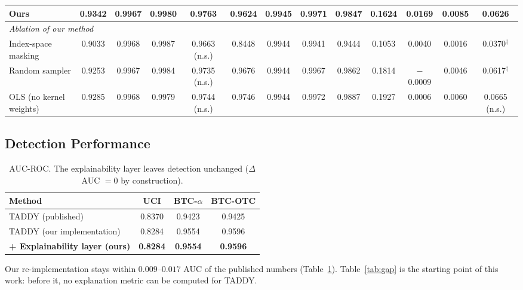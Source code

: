 \documentclass[conference]{IEEEtran}
\begin{document}
\begin{table}[!t]
\begin{tabular}{l cccc cccc cccc}
\rowcolor{ourblue!10}
\textbf{Ours}     & \textbf{0.9342} & 0.9967 & 0.9980 & \textbf{0.9763}
                  & 0.9624 & 0.9945 & \textbf{0.9971} & 0.9847
                  & \textbf{0.1624} & \textbf{0.0169} & \textbf{0.0085} & \textbf{0.0626} \\
\midrule
\multicolumn{13}{l}{\textit{Ablation of our method}} \\
Index-space masking & 0.9033 & 0.9968 & 0.9987 & 0.9663 (n.s.)
                  & 0.8448 & 0.9944 & 0.9941 & 0.9444
                  & 0.1053 & 0.0040 & 0.0016 & 0.0370$^{\dagger}$ \\
Random sampler    & 0.9253 & 0.9967 & 0.9984 & 0.9735 (n.s.)
                  & 0.9676 & 0.9944 & 0.9967 & 0.9862
                  & 0.1814 & $-$0.0009 & 0.0046 & 0.0617$^{\dagger}$ \\
OLS (no kernel weights) & 0.9285 & 0.9968 & 0.9979 & 0.9744 (n.s.)
                  & 0.9746 & 0.9944 & 0.9972 & 0.9887
                  & 0.1927 & 0.0006 & 0.0060 & 0.0665 (n.s.) \\
\bottomrule
\end{tabular}
\end{table}

\subsection{Detection Performance}

\begin{table}[!t]
\centering
\caption{AUC-ROC. The explainability layer leaves detection unchanged
($\Delta$AUC $=0$ by construction).}
\label{tab:auc}
\footnotesize
\setlength{\tabcolsep}{5pt}
\begin{tabular}{lccc}
\toprule
\textbf{Method} & \textbf{UCI} & \textbf{BTC-$\alpha$} & \textbf{BTC-OTC} \\
\midrule
TADDY \cite{liu2021taddy} (published) & 0.8370 & 0.9423 & 0.9425 \\
TADDY (our implementation)            & 0.8284 & 0.9554 & 0.9596 \\
\textbf{+ Explainability layer (ours)} & \textbf{0.8284} &
\textbf{0.9554} & \textbf{0.9596} \\
\bottomrule
\end{tabular}
\end{table}

Our re-implementation stays within $0.009$--$0.017$ AUC of the published
numbers (Table~\ref{tab:auc}). Table~\ref{tab:gap} is the starting point of
this work: before it, no explanation metric can be computed for TADDY.
\end{document}
